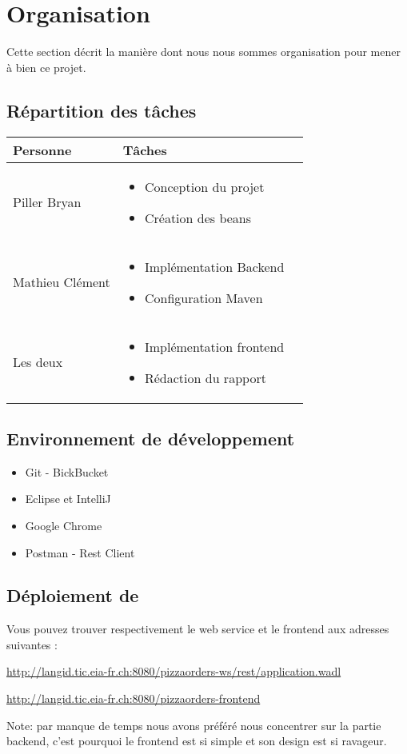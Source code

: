\section{Organisation}

Cette section décrit la manière dont nous nous sommes organisation pour mener à bien ce projet.

\subsection{Répartition des tâches}

\begin{tabular}{|l|p{7cm}|l|}
\hline
Personne & Tâches \\
\hline

Piller Bryan & 
\begin{itemize}
  \item Conception du projet
  \item Création des beans
\end{itemize}\\
\hline

Mathieu Clément & 
\begin{itemize}
  \item Implémentation Backend
  \item Configuration Maven   
\end{itemize}\\
\hline

Les deux &
\begin{itemize}
  \item Implémentation frontend
  \item Rédaction du rapport
\end{itemize}\\
\hline

\end{tabular}

\subsection{Environnement de développement}
\begin{itemize}
\item Git - BickBucket
\item Eclipse et IntelliJ
\item Google Chrome
\item Postman - Rest Client
\end{itemize}

\subsection{Déploiement de }

Vous pouvez trouver respectivement le web service et le frontend aux adresses suivantes :

\url{http://langid.tic.eia-fr.ch:8080/pizzaorders-ws/rest/application.wadl}

\url{http://langid.tic.eia-fr.ch:8080/pizzaorders-frontend}

Note: par manque de temps nous avons préféré nous concentrer sur la partie backend, c'est pourquoi 
le frontend est si simple et son design est si ravageur.



